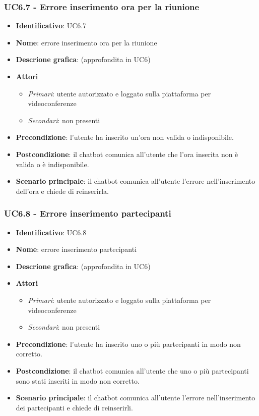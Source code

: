 \subsubsection{UC6.7 - Errore inserimento ora per la riunione}
\begin{itemize}
    \item \textbf{Identificativo}: UC6.7
    \item \textbf{Nome}: errore inserimento ora per la riunione
    \item \textbf{Descrione grafica}: (approfondita in UC6)
    \item \textbf{Attori}
 \begin{itemize} 
    \item \textit{Primari}: utente autorizzato e loggato sulla piattaforma per videoconferenze
    \item \textit{Secondari}: non presenti
 \end{itemize}
 \item \textbf{Precondizione}: l'utente ha inserito un'ora non valida o indisponibile.
 \item \textbf{Postcondizione}: il chatbot comunica all'utente che l'ora inserita non è valida o è indisponibile.
 \item \textbf{Scenario principale}: il chatbot comunica all'utente l'errore nell'inserimento dell'ora e chiede di reinserirla.
\end{itemize}
\subsubsection{UC6.8 - Errore inserimento partecipanti}
\begin{itemize}
    \item \textbf{Identificativo}: UC6.8
    \item \textbf{Nome}: errore inserimento partecipanti
    \item \textbf{Descrione grafica}: (approfondita in UC6)
    \item \textbf{Attori}
 \begin{itemize} 
    \item \textit{Primari}: utente autorizzato e loggato sulla piattaforma per videoconferenze
    \item \textit{Secondari}: non presenti
 \end{itemize}
 \item \textbf{Precondizione}: l'utente ha inserito uno o più partecipanti in modo non corretto.
 \item \textbf{Postcondizione}: il chatbot comunica all'utente che uno o più partecipanti sono stati inseriti in modo non corretto.
 \item \textbf{Scenario principale}: il chatbot comunica all'utente l'errore nell'inserimento dei partecipanti e chiede di reinserirli.
\end{itemize}
\newpage